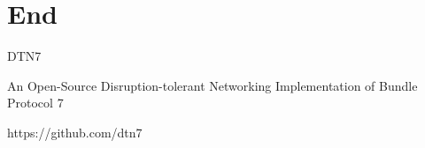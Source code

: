 \section{End}

\begin{frame}
\begin{center}
  \Large{DTN7}

  \large{An Open-Source Disruption-tolerant Networking Implementation of Bundle Protocol 7}
\end{center}

\begin{center}
  \Large{https://github.com/dtn7}
\end{center}
\end{frame}
